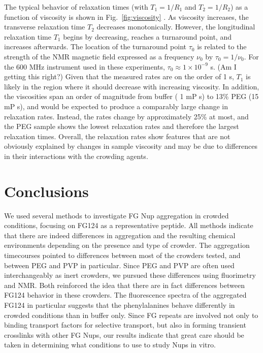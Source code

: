 The typical behavior of relaxation times (with $T_1 = 1/R_1$ and $T_2 = 1/R_2$) as a function of viscosity is shown in Fig.~\ref{fig:viscosity} \cite{reich18}.  As viscosity increases, the transverse relaxation time $T_2$ decreases monotonically.  However, the longitudinal relaxation time $T_1$ begins by decreasing, reaches a turnaround point, and increases afterwards.  The location of the turnaround point $\tau_0$ is related to the strength of the NMR magnetic field expressed as a frequency $\nu_0$ by $\tau_0 = 1/\nu_0$.  For the 600 MHz instrument used in these experiments, $\tau_0 \approx 1\times 10^{-9}$ s. (Am I getting this right?)  Given that the measured rates are on the order of 1 s, $T_1$ is likely in the region where it should decrease with increasing viscosity.  In addition, the viscosities span an order of magnitude from buffer ( 1 mP s) to 13\% PEG (15 mP s), and would be expected to produce a comparably large change in relaxation rates.  Instead, the rates change by approximately 25\% at most, and the PEG sample shows the lowest relaxation rates and therefore the largest relaxation times.  Overall, the relaxation rates show features that are not obviously explained by changes in sample viscosity and may be due to differences in their interactions with the crowding agents.

\section{Conclusions}

We used several methods to investigate FG Nup aggregation in crowded conditions, focusing on FG124 as a representative peptide.  All methods indicate that there are indeed differences in aggregation and the resulting chemical environments depending on the presence and type of crowder.  The aggregation timecourses pointed to differences between most of the crowders tested, and between PEG and PVP in particular.  Since PEG and PVP are often used interchangeably as inert crowders, we pursued  these differences using fluorimetry and NMR.  Both reinforced the idea that there are in fact differences between FG124 behavior in these crowders.  The fluorescence spectra of the aggregated FG124 in particular suggests that the phenylalanines behave differently in crowded conditions than in buffer only.  Since FG repeats are involved not only to binding transport factors for selective transport, but also in forming transient crosslinks with other FG Nups, our results indicate that great care should be taken in determining what conditions to use to study Nups in vitro.
